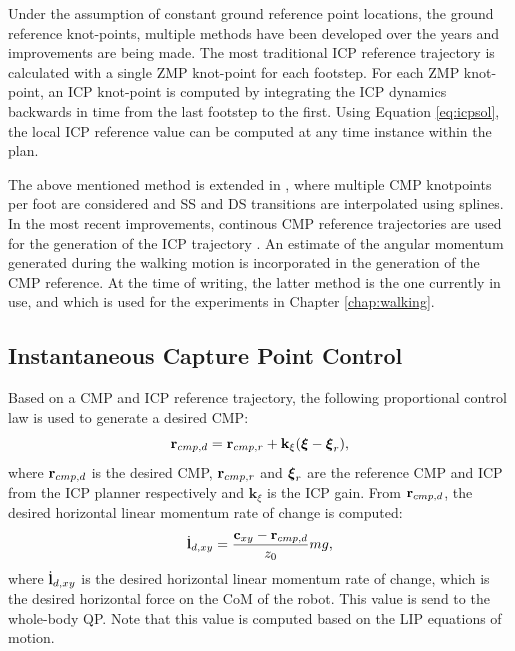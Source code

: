 Under the assumption of constant ground reference point locations, the ground reference knot-points, multiple methods have been developed over the years and improvements are being made. The most traditional \ac{ICP} reference trajectory is calculated with a single \ac{ZMP} knot-point \cite{englsberger2012integration} for each footstep. For each \ac{ZMP} knot-point, an \ac{ICP} knot-point is computed by integrating the \ac{ICP} dynamics backwards in time from the last footstep to the first. Using Equation \eqref{eq:icpsol}, the local \ac{ICP} reference value can be computed at any time instance within the plan. 

The above mentioned method is extended in \cite{englsberger2014trajectory}, where multiple \ac{CMP} knotpoints per foot are considered and \ac{SS} and \ac{DS} transitions are interpolated using splines. In the most recent improvements, continous \ac{CMP} reference trajectories are used for the generation of the \ac{ICP} trajectory \cite{seyde2018inclusion}. An estimate of the angular momentum generated during the walking motion is incorporated in the generation of the \ac{CMP} reference. At the time of writing, the latter method is the one currently in use, and which is used for the experiments in Chapter \ref{chap:walking}.
\subsection{Instantaneous Capture Point Control}\label{sec:icpcontrol}
Based on a \ac{CMP} and \ac{ICP} reference trajectory, the following proportional control law is used to generate a desired \ac{CMP}:
\begin{equation}
    \mathbf{r}_{cmp,d}=\mathbf{r}_{cmp,r} + \mathbf{k}_{\xi}(\boldsymbol{\xi}-\boldsymbol{\xi}_r),
    \label{eq:rcmpd}
\end{equation}
where $\mathbf{r}_{cmp,d}$ is the desired \ac{CMP}, $\mathbf{r}_{cmp,r}$ and $\boldsymbol{\xi}_r$ are the reference \ac{CMP} and \ac{ICP} from the \ac{ICP} planner respectively and $\mathbf{k}_{\xi}$ is the \ac{ICP} gain. From $\mathbf{r}_{cmp,d}$, the desired horizontal linear momentum rate of change is computed:
\begin{equation}\label{eq:dotldxy}
    \dot{\mathbf{l}}_{d,xy} = \frac{\mathbf{c}_{xy}-\mathbf{r}_{cmp,d}}{z_0}mg,
\end{equation}
where $\dot{\mathbf{l}}_{d,xy}$ is the desired horizontal linear momentum rate of change, which is the desired horizontal force on the \ac{CoM} of the robot. This value is send to the whole-body \ac{QP}. Note that this value is computed based on the \ac{LIP} equations of motion. 

